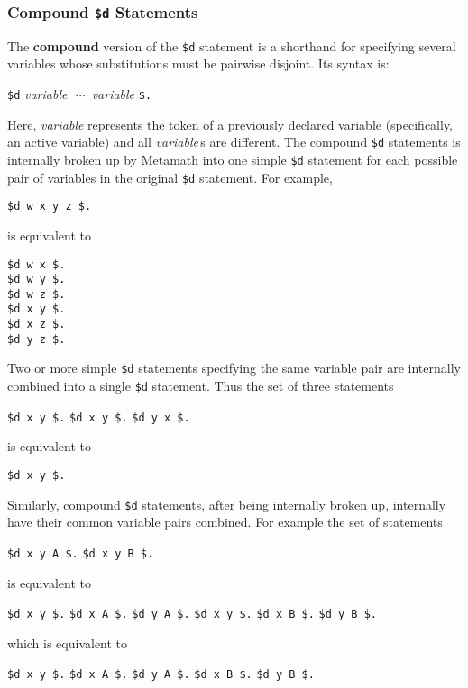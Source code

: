 \subsubsection{Compound \texttt{\$d} Statements}

The {\bf compound} version of the \texttt{\$d} statement is a shorthand for
specifying several variables whose substitutions must be pairwise disjoint.
Its syntax is:
\begin{center}
  \texttt{\$d} {\em variable}\ \,$\cdots$\ {\em variable} \texttt{\$.}
\end{center}
Here, {\em variable} represents the token of a previously declared
variable (specifically, an active variable) and all {\em variable}\,s are
different.  The compound \texttt{\$d}
statements is internally broken up by Metamath into one simple \texttt{\$d}
statement for each possible pair of variables in the original \texttt{\$d}
statement.  For example,
\begin{center}
  \texttt{\$d w x y z \$.}
\end{center}
is equivalent to
\begin{center}
  \texttt{\$d w x \$.}\\
  \texttt{\$d w y \$.}\\
  \texttt{\$d w z \$.}\\
  \texttt{\$d x y \$.}\\
  \texttt{\$d x z \$.}\\
  \texttt{\$d y z \$.}
\end{center}

Two or more simple \texttt{\$d} statements specifying the same variable pair are
internally combined into a single \texttt{\$d} statement.  Thus the set of three
statements
\begin{center}
  \texttt{\$d x y \$.}
  \texttt{\$d x y \$.}
  \texttt{\$d y x \$.}
\end{center}
is equivalent to
\begin{center}
  \texttt{\$d x y \$.}
\end{center}

Similarly, compound \texttt{\$d} statements, after being internally broken up,
internally have their common variable pairs combined.  For example the
set of statements
\begin{center}
  \texttt{\$d x y A \$.}
  \texttt{\$d x y B \$.}
\end{center}
is equivalent to
\begin{center}
  \texttt{\$d x y \$.}
  \texttt{\$d x A \$.}
  \texttt{\$d y A \$.}
  \texttt{\$d x y \$.}
  \texttt{\$d x B \$.}
  \texttt{\$d y B \$.}
\end{center}
which is equivalent to
\begin{center}
  \texttt{\$d x y \$.}
  \texttt{\$d x A \$.}
  \texttt{\$d y A \$.}
  \texttt{\$d x B \$.}
  \texttt{\$d y B \$.}
\end{center}

